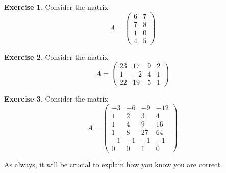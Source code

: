 \documentclass[11pt]{amsart}
\theoremstyle{definition}
\newtheorem{exercise}{Exercise}
\begin{document}
\begin{exercise}
Consider the matrix
\[
A = \begin{pmatrix}
6 & 7 \\
7 & 8 \\
1 & 0 \\
4 & 5
\end{pmatrix}
\]
\end{exercise}

\begin{exercise}
Consider the matrix
\[
A = \begin{pmatrix}
23 & 17 & 9 & 2 \\
1 & -2 & 4 & 1 \\
22 & 19 & 5 & 1
\end{pmatrix}
\]
\end{exercise}

\begin{exercise}
Consider the matrix
\[
A = \begin{pmatrix}
-3 & -6 & -9 & -12 \\
1 & 2 & 3 & 4 \\
1 & 4 & 9 & 16 \\
1 & 8 & 27 & 64 \\
-1 & -1 & -1 & -1 \\
0 & 0 & 1 & 0 
\end{pmatrix}
\]
\end{exercise}
As always, it will be crucial to explain how you know you are correct.
\end{document}
